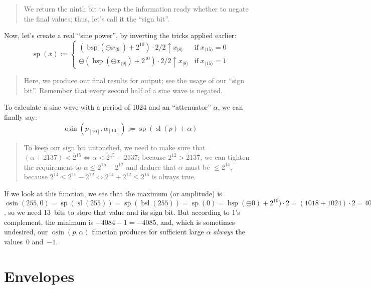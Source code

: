 \documentclass[english]{scrartcl}
\newenvironment{details}{
\par\nobreak\noindent%
\begin{quotation}%
  \footnotesize%
  \noindent\Radioactivity%
}{
\end{quotation}
}
\newcommand{\bit}[2]
	{{#1}_{\langle #2 \rangle}}
\newcommand{\msb}[2]
	{{#1}_{| #2 \rangle}}
\newcommand{\lsb}[2]
	{{#1}_{\langle #2 |}}
\newcommand{\bitlen}[2]
	{{#1}_{[#2]}}
\DeclareMathOperator{\bsl}{bsl}
\DeclareMathOperator{\bsp}{bsp}
\DeclareMathOperator{\osin}{osin}
\DeclareMathOperator{\osl}{sl}
\DeclareMathOperator{\osp}{sp}
\begin{document}
\begin{details}
We return the ninth bit to keep the information ready whether to negate the final values; thus, let's call it the ``sign bit''.
\end{details}

Now, let's create a real ``sine power'', by inverting the tricks applied earlier:
\[
  \osp(x) := \begin{cases}
    (\bsp(\ominus\lsb{x}{9}) + 2^{10}) \cdot 2 / 2 \uparrow \msb{x}{8} & \mathrm{if} \; \bit{x}{15}=0 \\
    \ominus(\bsp(\ominus\lsb{x}{9}) + 2^{10}) \cdot 2 / 2 \uparrow \msb{x}{8} & \mathrm{if} \; \bit{x}{15}=1
  \end{cases}
\]

\begin{details}
Here, we produce our final results for output; see the usage of our ``sign bit''.
Remember that every second half of a sine wave is negated.
\end{details}

To calculate a sine wave with a period of 1024 and an ``attenuator'' $\alpha$, we can finally say:
\[ \osin(\bitlen{p}{10},\bitlen{\alpha}{14}) := \osp(\osl(p)+\alpha) \]

\begin{details}
To keep our sign bit untouched, we need to make sure that $(\alpha+2137) < 2^{15} \iff \alpha < 2^{15}-2137$; because $2^{12} > 2137$, we can tighten the requirement to $\alpha \leq 2^{15}-2^{12}$ and deduce that $\alpha$ must be $\leq 2^{14}$, because $2^{14} \leq 2^{15}-2^{12} \iff 2^{14}+2^{12} \leq 2^{15}$ is always true.
\end{details}

If we look at this function, we see that the maximum (or amplitude) is $\osin(255,0) = \osp(\osl(255)) = \osp(\bsl(255)) = \osp(0) = \bsp(\ominus0)+2^{10}) \cdot 2 = (1018+1024) \cdot 2 = 4084$, so we need 13~bits to store that value and its sign bit.
But according to 1's complement, the minimum is $-4084-1=-4085$, and, which is sometimes undesired, our $\osin(p,\alpha)$ function produces for sufficient large $\alpha$ \emph{always} the values~0 and~$-1$.



\section{Envelopes}
\end{document}
